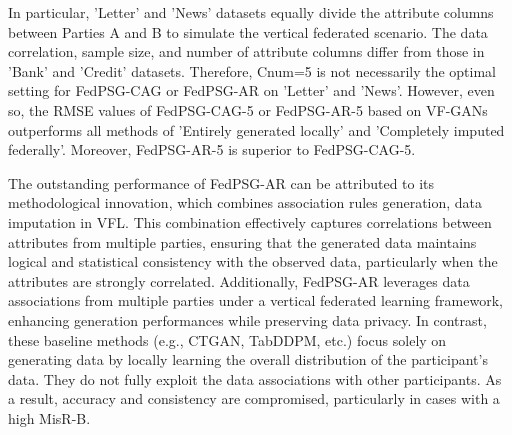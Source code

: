\documentclass[final,1p,times]{elsarticle}
\begin{document}
In particular, 'Letter' and 'News' datasets equally divide the attribute columns between Parties A and B to simulate the vertical federated scenario. The data correlation, sample size, and number of attribute columns differ from those in 'Bank' and 'Credit' datasets. Therefore, Cnum=5 is not necessarily the optimal setting for FedPSG-CAG or FedPSG-AR on 'Letter' and 'News'. However, even so, the RMSE values of FedPSG-CAG-5 or FedPSG-AR-5 based on VF-GANs outperforms all methods of 'Entirely generated locally' and 'Completely imputed federally'. Moreover, FedPSG-AR-5 is superior to FedPSG-CAG-5.

The outstanding performance of FedPSG-AR can be attributed to its methodological innovation, which combines association rules generation, data imputation in VFL. This combination effectively captures correlations between attributes from multiple parties, ensuring that the generated data maintains logical and statistical consistency with the observed data, particularly when the attributes are strongly correlated. Additionally, FedPSG-AR leverages data associations from multiple parties under a vertical federated learning framework, enhancing generation performances while preserving data privacy. In contrast, these baseline methods (e.g., CTGAN, TabDDPM, etc.) focus solely on generating data by locally learning the overall distribution of the participant's data. They do not fully exploit the data associations with other participants. As a result, accuracy and consistency are compromised, particularly in cases with a high MisR-B.
\end{document}
